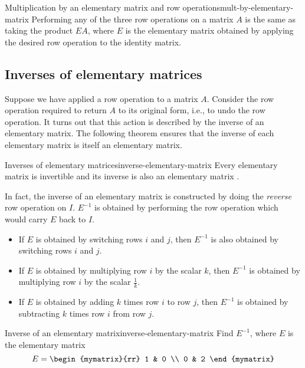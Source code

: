 \begin{theorem}{Multiplication by an elementary matrix and row operations}{mult-by-elementary-matrix}
  Performing any of the three row operations on a matrix $A$ is the
  same as taking the product $EA$, where $E$ is the elementary matrix
  obtained by applying the desired row operation to the identity
  matrix.
\end{theorem}

\subsection{Inverses of elementary matrices}

Suppose we have applied a row operation to a matrix $A$. Consider the
row operation required to return $A$ to its original form, i.e., to
undo the row operation. It turns out that this action is described by
the inverse of an elementary matrix. The following theorem ensures
that the inverse of each elementary matrix is itself an elementary
matrix.

\begin{theorem}{Inverses of elementary matrices}{inverse-elementary-matrix}
  Every elementary matrix is invertible and its inverse is also an
  elementary matrix%
  .
\end{theorem}

In fact, the inverse of an elementary matrix is constructed by doing
the {\em reverse \em}row operation on $I$. $E^{-1}$ is obtained by
performing the row operation which would carry $E$ back to $I$.

\begin{itemize}
\item If $E$ is obtained by switching rows $i$ and $j$, then $E^{-1}$
  is also obtained by switching rows $i$ and $j$.
\item If $E$ is obtained by multiplying row $i$ by the scalar $k$,
  then $E^{-1}$ is obtained by multiplying row $i$ by the scalar
  $\frac{1}{k}$.
\item If $E$ is obtained by adding $k$ times row $i$ to row $j$, then
  $E^{-1}$ is obtained by subtracting $k$ times row $i$ from row $j$.
\end{itemize}

\begin{example}{Inverse of an elementary matrix}{inverse-elementary-matrix}
  Find $E^{-1}$, where $E$ is the elementary matrix
  \begin{equation*}
    E
    =
    \begin{mymatrix}{rr}
      1 & 0 \\
      0 & 2
    \end{mymatrix}
  \end{equation*}
\end{example}

